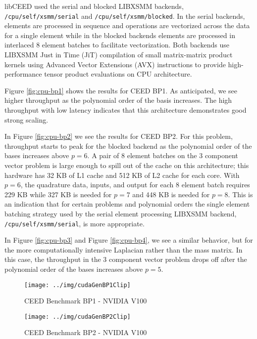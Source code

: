 libCEED used the serial and blocked LIBXSMM \cite{libxsmm} backends, \lstinline{/cpu/self/xsmm/serial} and \lstinline{/cpu/self/xsmm/blocked}.
In the serial backends, elements are processed in sequence and operations are vectorized across the data for a single element while in the blocked backends elements are processed in interlaced 8 element batches to facilitate vectorization.
Both backends use LIBXSMM Just in Time (JiT) compilation of small matrix-matrix product kernels using Advanced Vector Extensions (AVX) instructions to provide high-performance tensor product evaluations on CPU architecture.

Figure \ref{fig:cpu-bp1} shows the results for CEED BP1.
As anticipated, we see higher throughput as the polynomial order of the basis increases.
The high throughput with low latency indicates that this architecture demonstrates good strong scaling.

In Figure \ref{fig:cpu-bp2} we see the results for CEED BP2.
For this problem, throughput starts to peak for the blocked backend as the polynomial order of the bases increases above $p = 6$.
A pair of 8 element batches on the 3 component vector problem is large enough to spill out of the cache on this architecture; this hardware has 32 KB of L1 cache and 512 KB of L2 cache for each core.
With $p = 6$, the quadrature data, inputs, and output for each 8 element batch requires 229 KB while 327 KB is needed for $p = 7$ and 448 KB is needed for $p = 8$.
This is an indication that for certain problems and polynomial orders the single element batching strategy used by the serial element processing LIBXSMM backend, \lstinline{/cpu/self/xsmm/serial}, is more appropriate.

In Figure \ref{fig:cpu-bp3} and Figure \ref{fig:cpu-bp4}, we see a similar behavior, but for the more computationally intensive Laplacian rather than the mass matrix.
In this case, the throughput in the 3 component vector problem drops off after the polynomial order of the bases increases above $p = 5$.

\begin{figure}[ht!]
\texttt{[image: ../img/cudaGenBP1Clip]}
\caption{CEED Benchmark BP1 - NVIDIA V100}
\label{fig:gpu-bp1}
\end{figure}

\begin{figure}[ht!]
\texttt{[image: ../img/cudaGenBP2Clip]}
\caption{CEED Benchmark BP2 - NVIDIA V100}
\label{fig:gpu-bp2}
\end{figure}

